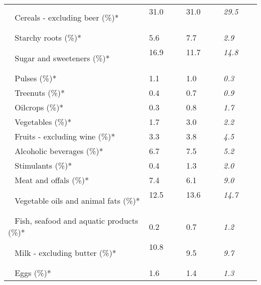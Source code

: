 \begin{tabular}{L{3.9cm} R{1cm} R{1cm} R{1cm}}
	 ~ Cereals - excluding beer (\%)* & 31.0 ~ \ \ & 31.0 ~ \ \ & \textit{29.5} ~ \ \ \\ 
	 ~ Starchy roots (\%)* & 5.6 ~ \ \ & 7.7 ~ \ \ & \textit{2.9} ~ \ \ \\ 
	 ~ Sugar and sweeteners (\%)* & 16.9 ~ \ \ & 11.7 ~ \ \ & \textit{14.8} ~ \ \ \\ 
	 ~ Pulses (\%)* & 1.1 ~ \ \ & 1.0 ~ \ \ & \textit{0.3} ~ \ \ \\ 
	 ~ Treenuts (\%)* & 0.4 ~ \ \ & 0.7 ~ \ \ & \textit{0.9} ~ \ \ \\ 
	 ~ Oilcrops (\%)* & 0.3 ~ \ \ & 0.8 ~ \ \ & \textit{1.7} ~ \ \ \\ 
	 ~ Vegetables (\%)* & 1.7 ~ \ \ & 3.0 ~ \ \ & \textit{2.2} ~ \ \ \\ 
	 ~ Fruits - excluding wine (\%)* & 3.3 ~ \ \ & 3.8 ~ \ \ & \textit{4.5} ~ \ \ \\ 
	 ~ Alcoholic beverages (\%)* & 6.7 ~ \ \ & 7.5 ~ \ \ & \textit{5.2} ~ \ \ \\ 
	 ~ Stimulants (\%)* & 0.4 ~ \ \ & 1.3 ~ \ \ & \textit{2.0} ~ \ \ \\ 
	 ~ Meat and offals (\%)* & 7.4 ~ \ \ & 6.1 ~ \ \ & \textit{9.0} ~ \ \ \\ 
	 ~ Vegetable oils and animal fats (\%)* & 12.5 ~ \ \ & 13.6 ~ \ \ & \textit{14.7} ~ \ \ \\ 
	 ~ Fish, seafood and aquatic products (\%)* & 0.2 ~ \ \ & 0.7 ~ \ \ & \textit{1.2} ~ \ \ \\ 
	 ~ Milk - excluding butter (\%)* & 10.8 ~ \ \ & 9.5 ~ \ \ & \textit{9.7} ~ \ \ \\ 
	 ~ Eggs (\%)* & 1.6 ~ \ \ & 1.4 ~ \ \ & \textit{1.3} ~ \ \ \\ 
       \toprule
      \end{tabular}
      \clearpage
{}
